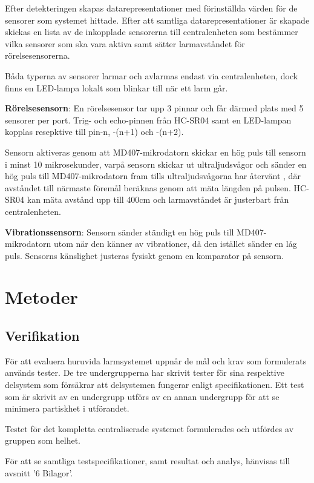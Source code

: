 \documentclass{article}
\begin{document}
Efter detekteringen skapas datarepresentationer med förinställda värden för de
sensorer som systemet hittade. Efter att samtliga datarepresentationer är skapade skickas 
en lista av de inkopplade sensorerna till centralenheten som bestämmer vilka sensorer som ska vara aktiva 
samt sätter larmavståndet för rörelsesensorerna.

Båda typerna av sensorer larmar och avlarmas endast via centralenheten, dock finns en LED-lampa lokalt som blinkar till när ett larm går.

\textbf{Rörelsesensorn}: 
En rörelsesensor tar upp 3 pinnar och får därmed plats med 5 sensorer per port. 
Trig- och echo-pinnen från HC-SR04 samt en LED-lampan kopplas resepktive till  pin-n, -(n+1) och -(n+2).


Sensorn aktiveras genom att MD407-mikrodatorn skickar en hög puls till sensorn i minst 10 mikrosekunder, 
 varpå sensorn skickar ut ultraljudsvågor och sänder en hög puls till MD407-mikrodatorn fram tills ultraljudsvågorna har återvänt , där avståndet till närmaste föremål beräknas genom att mäta längden på pulsen. 
HC-SR04 kan mäta avstånd upp till 400cm och larmavståndet är justerbart från centralenheten.

\textbf{Vibrationssensorn}: Sensorn sänder ständigt en hög puls till MD407-mikrodatorn utom när den känner av vibrationer, då den istället sänder en låg puls. 
Sensorns känslighet justeras fysiskt genom en komparator på sensorn.




\section{Metoder}
\label{stm}
\subsection{Verifikation}
För att evaluera huruvida larmsystemet uppnår de mål och krav som formulerats används tester. 
De tre undergrupperna har skrivit tester för sina respektive delsystem som försäkrar att 
delsystemen fungerar enligt specifikationen. Ett test som är skrivit av en undergrupp utförs
av en annan undergrupp för att se minimera partiskhet i utförandet. 

Testet för det kompletta centraliserade systemet formulerades och utfördes av gruppen som helhet.

För att se samtliga testspecifikationer, samt resultat och analys, hänvisas till avsnitt '6 Bilagor'.
\end{document}
